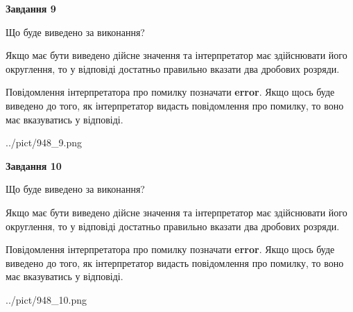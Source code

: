 \documentclass[12pt, ukrainian]{article}
\begin{document}
{\begin {Large}
{\begin {center}\textbf{Завдання 9}\end {center}}\par
Що буде виведено за виконання? \par

Якщо має бути виведено дійсне значення та інтерпретатор має здійснювати його округлення, 
то у відповіді достатньо правильно вказати два дробових розряди.

Повідомлення інтерпретатора про помилку позначати \textbf{error}.
Якщо щось буде виведено до того, як інтерпретатор видасть повідомлення про помилку, 
то воно має вказуватись у відповіді. \par

\begin{center}
	{../pict/948_9.png}
\end{center}
\newpage

{\begin {center}\textbf{Завдання 10}\end {center}}\par
Що буде виведено за виконання? \par

Якщо має бути виведено дійсне значення та інтерпретатор має здійснювати його округлення, 
то у відповіді достатньо правильно вказати два дробових розряди.

Повідомлення інтерпретатора про помилку позначати \textbf{error}.
Якщо щось буде виведено до того, як інтерпретатор видасть повідомлення про помилку, 
то воно має вказуватись у відповіді. \par

\begin{center}
	{../pict/948_10.png}
\end{center}
\newpage

\end {Large}}
\end{document}

